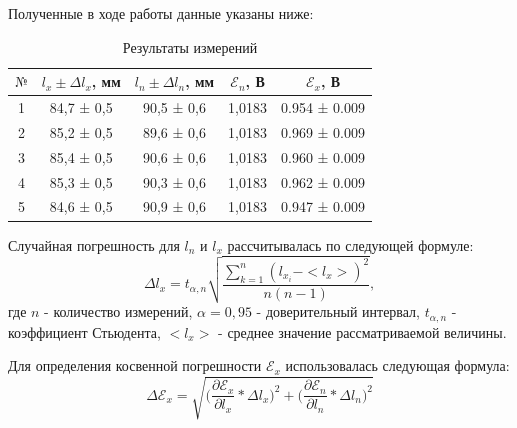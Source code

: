 \documentclass[a4paper,12pt]{article}
\begin{document}
Полученные в ходе работы данные указаны ниже:
\begin{table}[!h]
\begin{center}
	\begin{tabular}{|c|c|c|c|c|}
		\hline
		$№$&$l_x \pm\Delta l_x$, мм&$l_n \pm\Delta l_n$, мм&$\mathcal{E}_n$, В&$\mathcal{E}_x$, В
		\\ 
		\hline
		1	&84,7	 ± 0,5 & 	 90,5 ± 0,6 	&1,0183	& 0.954 ± 0.009
		\\
		\hline
		2	&85,2	 ± 0,5 &	 89,6 ± 0,6		&1,0183	& 0.969 ± 0.009
		\\
		\hline
		3	&85,4	 ± 0,5 &	 90,6 ± 0,6		&1,0183	& 0.960 ± 0.009
		\\
		\hline
		4	&85,3	 ± 0,5 & 	90,3 ± 0,6		&1,0183	& 0.962 ± 0.009
		\\
		\hline
		5	&84,6	 ± 0,5 & 	90,9 ± 0,6		&1,0183 	& 0.947 ± 0.009
		\\
		\hline	
	\end{tabular}
	\caption{Результаты измерений}
	\end{center}
\end{table}

Случайная погрешность для $l_n$ и $l_x$ рассчитывалась по следующей формуле:
$$\Delta l_x = t_{\alpha,n}\sqrt{\frac{\sum_{k=1}^n(l_{x_i} - <l_x>)^2}{n(n-1)}},$$
где $n$ - количество измерений, $\alpha = 0,95$ - доверительный интервал, $t_{\alpha,n}$ - коэффициент Стьюдента, $<l_x>$ - среднее значение рассматриваемой величины.

Для определения косвенной погрешности $\mathcal{E}_x$ использовалась следующая формула:
$$ \Delta \mathcal{E}_x = \sqrt{\bigg(\frac{\partial\mathcal{E}_x}{\partial l_x}*\Delta l_x\bigg)^2 + \bigg(\frac{\partial\mathcal{E}_n}{\partial l_n}*\Delta l_n\bigg)^2}$$
\end{document}
